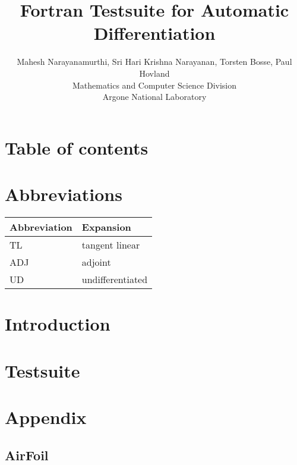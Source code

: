 \documentclass[conference,english]{article}
\begin{document}
\title{Fortran Testsuite for Automatic Differentiation}
\author{Mahesh Narayanamurthi, Sri Hari Krishna Narayanan, Torsten Bosse, Paul Hovland\\
Mathematics and Computer Science Division\\
Argone National Laboratory\\
}
\maketitle
\clearpage
\section*{Table of contents}
\tableofcontents
\lstlistoflistings
\clearpage
\section{Abbreviations}
\begin{table}[h]
\centering
\label{abbr_table}
\begin{tabular}{@{}|l|l|@{}}
\hline
\textbf{Abbreviation} & \textbf{Expansion}      \\ \hline
TL           & tangent linear \\ \hline
ADJ           & adjoint \\ \hline
UD           & undifferentiated \\ \hline
\end{tabular}
\end{table}
\clearpage
\section{Introduction}
\clearpage
\section{Testsuite}
\clearpage
\clearpage 

\section{Appendix}
\subsection{AirFoil}\label{diff_airfoil}
\end{document}
